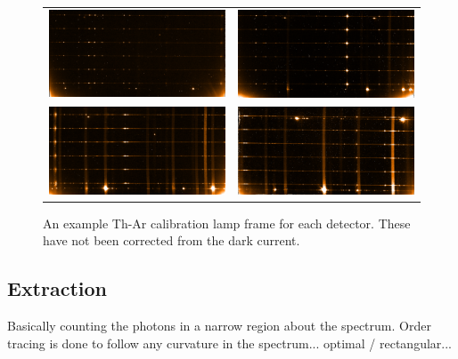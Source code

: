 \begin{figure}
    \begin{tabular}{cc}
         \includegraphics[width=.45\hsize]{./figures/reduction/Thar_1.png} & \includegraphics[width=.45\hsize]{./figures/reduction/Thar_2.png} \\
         \includegraphics[width=.45\hsize]{./figures/reduction/Thar_3.png} & \includegraphics[width=.45\hsize]{./figures/reduction/Thar_4.png} \\
    \end{tabular}
   
    \caption{An example Th-Ar calibration lamp frame for each detector. These have not been corrected from the dark current.}
    \label{fig:caliblamps}
\end{figure}


\subsection{Extraction}
Basically counting the photons in a narrow region about the spectrum. Order tracing is done to follow any curvature in the spectrum...
optimal / rectangular...

